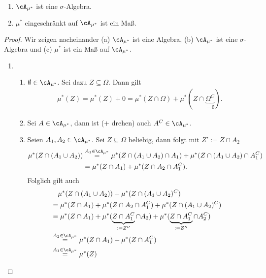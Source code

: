 \begin{satz}\abs
	\begin{enumerate}[label=(\roman*)]		
		\item $\cA_{\mu^{*}}$ ist eine $\sigma$-Algebra.
		\item $\mu^{*}$ eingeschränkt auf $\cA_{\mu^{*}}$ ist ein Maß.
	\end{enumerate}
\end{satz}

\begin{proof}
	Wir zeigen nacheinander (a) $\cA_{\mu^{*}}$ ist eine Algebra, (b) $\cA_{\mu^{*}}$ ist eine $\sigma$-Algebra und (c) $\mu^{*}$ ist ein Maß auf $\cA_{\mu^{*}}$.
	\begin{enumerate}[label=(\alph*)]
		\item \abs
		\begin{enumerate}[label=(\roman*)]
			\item $\emptyset \in \cA_{\mu^{*}}$. Sei dazu $Z \subseteq \Omega$. Dann gilt 
			\begin{gather*}
			\mu^{*}(Z) = \mu^{*}(Z) + 0 = \mu^{*}(Z \cap \Omega) + \mu^{*}(Z \cap \underbrace{\Omega^C}_{= \emptyset}).
			\end{gather*}
			\item Sei $A \in \cA_{\mu^{*}}$, dann ist ($+$ drehen) auch $A^C \in \cA_{\mu^{*}}$.
			\item Seien $A_1, A_2 \in \cA_{\mu^{*}}$. Sei $Z \subseteq \Omega$ beliebig, dann folgt mit $Z':= Z\cap A_2$
			\begin{align*}
			\mu^{*}(Z \cap (A_1 \cup A_2))&\overset{A_1 \in \cA_{\mu^{*}}}{=} \mu^*(Z\cap(A_1\cup A_2)\cap A_1)+\mu^*(Z\cap(A_1\cup A_2)\cap A_1^C)\\
			&= \mu^{*}(Z \cap A_1) + \mu^{*}(Z \cap A_2 \cap A_1^C).
			\end{align*}
			Folglich gilt auch
			\begin{align*}
			&\quad \mu^{*}(Z \cap (A_1 \cup A_2)) + \mu^{*}(Z \cap (A_1 \cup A_2)^C)\\
			&= \mu^{*}(Z \cap A_1) + \mu^{*}(Z \cap A_2 \cap A_1^C) + \mu^{*}(Z \cap (A_1 \cup A_2)^C)&\\
			&= \mu^{*}(Z \cap A_1) + \mu^{*}(\underbrace{Z \cap A_1^C}_{:= Z''} \cap A_2) + \mu^{*}(\underbrace{Z \cap A_1^C}_{:= Z''} \cap A_2^C)&\\
			&\overset{A_2 \in \cA_{\mu^{*}}}{=} \mu^{*}(Z \cap A_1) + \mu^{*}(Z \cap A_1^C)\\& \overset{A_1 \in \cA_{\mu^{*}}}{=} \mu^{*}(Z)
			\end{align*}

\end{enumerate}
\end{enumerate}
\end{proof}

